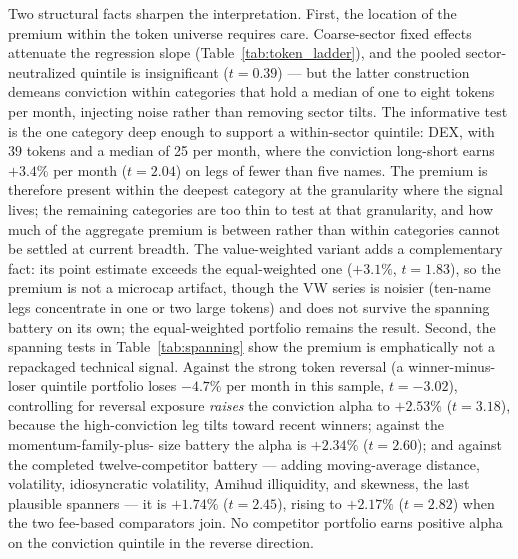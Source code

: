 \documentclass[12pt]{article}
\begin{document}
Two structural facts sharpen the interpretation. First, the location of the premium
within the token universe requires care. Coarse-sector fixed effects attenuate the
regression slope (Table~\ref{tab:token_ladder}), and the pooled sector-neutralized
quintile is insignificant ($t=0.39$) --- but the latter construction demeans
conviction within categories that hold a median of one to eight tokens per month,
injecting noise rather than removing sector tilts. The informative test is the one
category deep enough to support a within-sector quintile: DEX, with 39 tokens and a
median of 25 per month, where the conviction long-short earns $+3.4\%$ per month
($t=2.04$) on legs of fewer than five names. The premium is therefore present within
the deepest category at the granularity where the signal lives; the remaining
categories are too thin to test at that granularity, and how much of the aggregate
premium is between rather than within categories cannot be settled at current
breadth. The value-weighted variant adds a
complementary fact: its point estimate exceeds the equal-weighted one ($+3.1\%$,
$t=1.83$), so the premium is not a microcap artifact, though the VW series is noisier
(ten-name legs concentrate in one or two large tokens) and does not survive the
spanning battery on its own; the equal-weighted portfolio remains the result. Second,
the spanning tests in Table~\ref{tab:spanning} show the premium is emphatically not a
repackaged technical signal. Against the strong token reversal (a winner-minus-loser
quintile portfolio loses $-4.7\%$ per month in this sample, $t=-3.02$), controlling for
reversal exposure \textit{raises} the conviction alpha to $+2.53\%$ ($t=3.18$), because
the high-conviction leg tilts toward recent winners; against the momentum-family-plus-
size battery the alpha is $+2.34\%$ ($t=2.60$); and against the completed
twelve-competitor battery --- adding moving-average distance, volatility,
idiosyncratic volatility, Amihud illiquidity, and skewness, the last plausible
spanners --- it is $+1.74\%$ ($t=2.45$), rising to $+2.17\%$ ($t=2.82$) when the two
fee-based comparators join. No competitor portfolio earns positive alpha on the
conviction quintile in the reverse direction.
\end{document}
